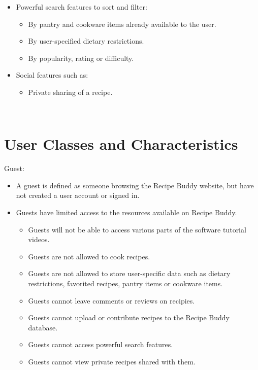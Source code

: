 \documentclass{scrreprt}
\begin{document}
\begin{itemize}
\begin{itemize}
          \end{itemize}
    \item Powerful search features to sort and filter:
          \begin{itemize}
              \item By pantry and cookware items already available to the user.
              \item By user-specified dietary restrictions.
              \item By popularity, rating or difficulty.
          \end{itemize}
    \item Social features such as:
          \begin{itemize}
              \item Private sharing of a recipe.
          \end{itemize}
\end{itemize}
$ $

\section{User Classes and Characteristics}
Guest:
\begin{itemize}
    \item A guest is defined as someone browsing the Recipe Buddy website, but have not created a user account or signed in.
    \item Guests have limited access to the resources available on Recipe Buddy.
    \begin{itemize}
        \item Guests will not be able to access various parts of the software tutorial videos.
        \item Guests are not allowed to cook recipes.
        \item Guests are not allowed to store user-specific data such as dietary restrictions, favorited recipes, pantry items or cookware items.
        \item Guests cannot leave comments or reviews on recipies.
        \item Guests cannot upload or contribute recipes to the Recipe Buddy database.
        \item Guests cannot access powerful search features.
        \item Guests cannot view private recipes shared with them.
    \end{itemize}
\end{itemize}
\end{document}
